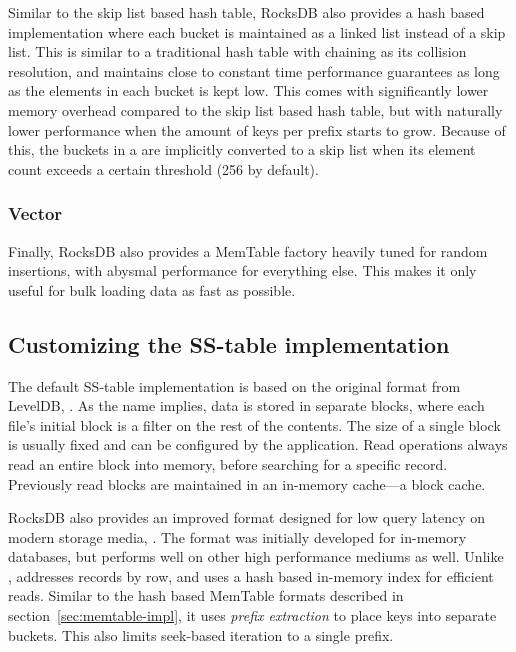 Similar to the skip list based hash table, RocksDB also provides a hash based
implementation where each bucket is maintained as a linked list instead of a
skip list. This is similar to a traditional hash table with chaining as its
collision resolution, and maintains close to constant time performance
guarantees as long as the elements in each bucket is kept low. This comes with
significantly lower memory overhead compared to the skip list based hash table,
but with naturally lower performance when the amount of keys per prefix starts
to grow. Because of this, the buckets in a  are implicitly
converted to a skip list when its element count exceeds a certain threshold (256
by default).

\subsubsection{Vector}

Finally, RocksDB also provides a MemTable factory heavily tuned for random
insertions, with abysmal performance for everything else. This makes it only
useful for bulk loading data as fast as possible.

\subsection{Customizing the SS-table implementation}\label{sec:ss-table}

The default SS-table implementation is based on the original format from
LevelDB,
.
As the name implies, data is stored in separate blocks, where each file's
initial block is a filter on the rest of the contents. The size of a single
block is usually fixed and can be configured by the application. Read operations
always read an entire block into memory, before searching for a specific record.
Previously read blocks are maintained in an in-memory cache---a block cache.

RocksDB also provides an improved format designed for low query latency on
modern storage media,
.
The format was initially developed for in-memory databases, but performs well on
other high performance mediums as well. Unlike ,
 addresses records by row, and uses a hash based in-memory
index for efficient reads. Similar to the hash based MemTable formats described
in section~\ref{sec:memtable-impl}, it uses \textit{prefix extraction} to place
keys into separate buckets. This also limits seek-based iteration to a single
prefix.

